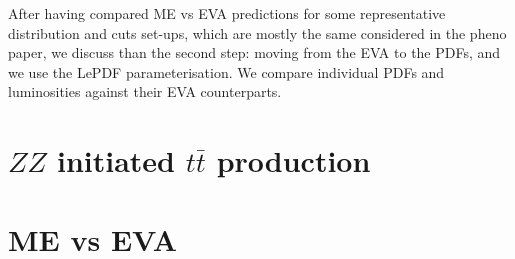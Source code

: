 \documentclass[a4paper,11pt]{article}
\begin{document}
\begin{table}[!t]
\begin{center}
\caption{
EW chiral couplings and coupling strength normalizations used in the EVA for fermions $f,f'$ with weak isospin charge $(T_3^f)_L=\pm1/2$ and electric charge $Q^f$, with normalization $Q^\ell=-1$.
}
\label{tab:ewa_coup}
\end{center}
\end{table}



After having compared ME vs EVA predictions for some representative distribution and cuts set-ups, which are mostly the same considered in the pheno paper, we discuss than the second step: moving from the EVA to the PDFs, and we use the {\small \sc LePDF} parameterisation.
We compare individual PDFs and luminosities against their EVA counterparts.
 


\section{$ZZ$ initiated $t \bar t$ production}




\clearpage
\appendix

\section{ME vs EVA}
\end{document}
